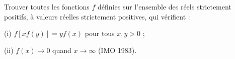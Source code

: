 Trouver toutes les fonctions $f$ définies sur l'ensemble des réels strictement positifs, à valeurs réelles strictement positives, qui vérifient :

(i) $f[xf(y)] = yf(x)$ pour tous $x, y > 0$ ;

(ii) $f(x) \to 0$ quand $x \to \infty$ (IMO 1983).

